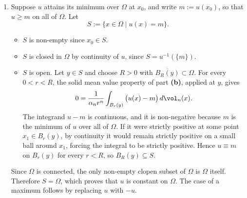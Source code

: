 \begin{exercisesolution}
\begin{enumerate}[label=\textbf{(\alph*)}]
    To obtain the volume mean value property, integrate the spherical identity in
    polar/spherical coordinates. Spherical slicing (Fubini) writes an integral over the ball as
    an integral of its sphere integrals, and part \textbf{(b)} evaluates each of those: since
    $\phi(\rho) = u(x_0)$, the sphere $\partial B_\rho(x_0)$ contributes
    $\omega_{n-1}\rho^{n-1}u(x_0)$. Hence
    \begin{align*}
      \int_{B_r(x_0)} u(x) \, d\vol_n(x)
        &= \int_0^r \left( \int_{\partial B_\rho(x_0)} u \, d\vol_{n-1} \right) d\rho \\
        &= \int_0^r \omega_{n-1} \rho^{n-1} u(x_0) \, d\rho
         = u(x_0) \frac{\omega_{n-1} r^n}{n}.
    \end{align*}
    Note that no extra factor of $\rho^{n-1}$ enters: the surface measure $d\vol_{n-1}$ on
    $\partial B_\rho(x_0)$ already carries it, which is exactly why the sphere integral above is
    proportional to $\rho^{n-1}$ rather than constant.
    Since $\alpha_n = \omega_{n-1}/n$ is the volume of the unit ball, this yields
    \[u(x_0) = \frac{1}{\alpha_n r^n} \int_{B_r(x_0)} u(x) \, d\vol_n(x).\]

  \item Suppose $u$ attains its minimum over $\Omega$ at $x_0$, and write $m := u(x_0)$, so that
    $u \geq m$ on all of $\Omega$. Let
    \[S := \{x \in \Omega \mid u(x) = m\}.\]
    \begin{itemize}
      \item $S$ is non-empty since $x_0 \in S$.
      \item $S$ is closed in $\Omega$ by continuity of $u$, since $S = u^{-1}(\{m\})$.
      \item $S$ is open. Let $y \in S$ and choose $R > 0$ with $\overline{B_R(y)} \subset \Omega$.
        For every $0 < r < R$, the solid mean value property of part \textbf{(b)}, applied at $y$,
        gives
        \[0 = \frac{1}{\alpha_n r^n} \int_{B_r(y)} \big(u(x) - m\big) \, d\vol_n(x).\]
        The integrand $u - m$ is continuous, and it is non-negative because $m$ is the minimum
        of $u$ over all of $\Omega$. If it were strictly positive at some point $x_1 \in B_r(y)$,
        by continuity it would remain strictly positive on a small ball around $x_1$, forcing the
        integral to be strictly positive. Hence $u \equiv m$ on $B_r(y)$ for every $r < R$, so
        $B_R(y) \subseteq S$.
    \end{itemize}
    Since $\Omega$ is connected, the only non-empty clopen subset of $\Omega$ is $\Omega$ itself.
    Therefore $S = \Omega$, which proves that $u$ is constant on $\Omega$.
    The case of a maximum follows by replacing $u$ with $-u$.
\end{enumerate}


\end{exercisesolution}

